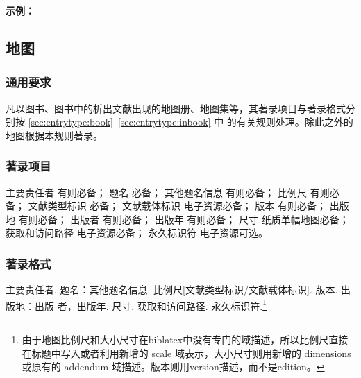 \documentclass[twoside]{article}%
\begin{document}


\begin{refsection}
\nocite{李鸿章1887,湖北省建设厅1931,武汉市军事管制委员会1949,FITZWILLIAM1570,
中国第一历史档案馆2001--,清代奏折汇编2005,私立武昌2021}


\textbf{示例：}

{\printbibliography[heading=none,env=indentegenv]}

\end{refsection}


\subsection{地图}

\subsubsection{通用要求}

凡以图书、图书中的析出文献出现的地图册、地图集等，其著录项目与著录格式分别按 \ref{sec:entrytype:book}--\ref{sec:entrytype:inbook} 中
的有关规则处理。除此之外的地图根据本规则著录。

\subsubsection{著录项目}

主要责任者 有则必备；
题名 必备；
其他题名信息 有则必备；
比例尺 有则必备；
文献类型标识 必备；
文献载体标识 电子资源必备；
版本 有则必备；
出版地 有则必备；
出版者 有则必备；
出版年 有则必备；
尺寸 纸质单幅地图必备；
获取和访问路径 电子资源必备；
永久标识符 电子资源可选。

\subsubsection{著录格式}

主要责任者. 题名：其他题名信息. 比例尺[文献类型标识/文献载体标识]. 版本. 出版地：出版
者，出版年. 尺寸. 获取和访问路径. 永久标识符.\footnote{由于地图比例尺和大小尺寸在biblatex中没有专门的域描述，所以比例尺直接在标题中写入或者利用新增的 scale 域表示，大小尺寸则用新增的 dimensions 或原有的 addendum 域描述。版本则用version描述，而不是edition。}
\end{document}
